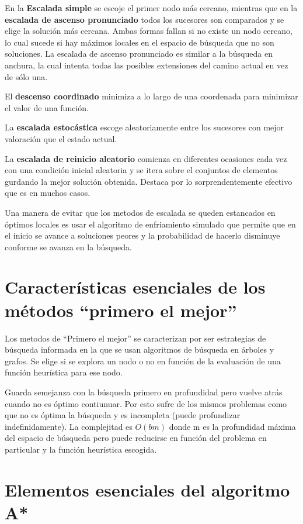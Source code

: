\documentclass[12pt]{article}
\begin{document}
En la \textbf{Escalada simple} se escoje el primer nodo más cercano,
mientras que en la \textbf{escalada de ascenso pronunciado} todos los
sucesores son comparados y se elige la solución más cercana. Ambas
formas fallan si no existe un nodo cercano, lo cual sucede si hay
máximos locales en el espacio de búsqueda que no son soluciones. La
escalada de ascenso pronunciado es similar a la búsqueda en anchura,
la cual intenta todas las posibles extensiones del camino actual en
vez de sólo una.

El \textbf{descenso coordinado} minimiza a lo largo de una coordenada
para minimizar el valor de una función.

La \textbf{escalada estocástica} escoge aleatoriamente entre los
sucesores con mejor valoración que el estado actual.

La \textbf{escalada de reinicio aleatorio} comienza en diferentes
ocasiones cada vez con una condición inicial aleatoria y se itera
sobre el conjuntos de elementos gurdando la mejor solución obtenida.
Destaca por lo sorprendentemente efectivo que es en muchos casos.

Una manera de evitar que los metodos de escalada se queden estancados
en óptimos locales es usar el algoritmo de enfriamiento simulado que
permite que en el inicio se avance a soluciones peores y la
probabilidad de hacerlo disminuye conforme se avanza en la búsqueda.


\section{Características esenciales de los métodos “primero el mejor”}

Los metodos de ``Primero el mejor'' se caracterizan por ser
estrategias de búsqueda informada en la que se usan algoritmos de
búsqueda en árboles y grafos. Se elige si se explora un nodo o no en
función de la evaluación de una función heurística para ese nodo.

Guarda semejanza con la búsqueda primero en profundidad pero vuelve
atrás cuando no es óptimo contiunuar. Por esto sufre de los mismos
problemas como que no es óptima la búsqueda y es incompleta (puede
profundizar indefinidamente). La complejitad es $O(bm)$ donde m es la
profundidad máxima del espacio de búsqueda pero puede reducirse en
función del problema en particular y la función heurística escogida.

\section{Elementos esenciales del algoritmo A*}
\end{document}
